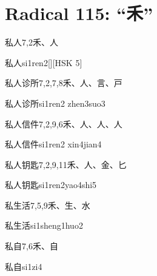 
\section*{Radical 115: ``⽲''}

\begin{entry}{私人}{7,2}{⽲、⼈}
  \begin{phonetics}{私人}{si1ren2}[][HSK 5]
  \end{phonetics}
\end{entry}

\begin{entry}{私人诊所}{7,2,7,8}{⽲、⼈、⾔、⼾}
  \begin{phonetics}{私人诊所}{si1ren2 zhen3suo3}
  \end{phonetics}
\end{entry}

\begin{entry}{私人信件}{7,2,9,6}{⽲、⼈、⼈、⼈}
  \begin{phonetics}{私人信件}{si1ren2 xin4jian4}
  \end{phonetics}
\end{entry}

\begin{entry}{私人钥匙}{7,2,9,11}{⽲、⼈、⾦、⼔}
  \begin{phonetics}{私人钥匙}{si1ren2yao4shi5}
  \end{phonetics}
\end{entry}

\begin{entry}{私生活}{7,5,9}{⽲、⽣、⽔}
  \begin{phonetics}{私生活}{si1sheng1huo2}
  \end{phonetics}
\end{entry}

\begin{entry}{私自}{7,6}{⽲、⾃}
  \begin{phonetics}{私自}{si1zi4}
  \end{phonetics}
\end{entry}

